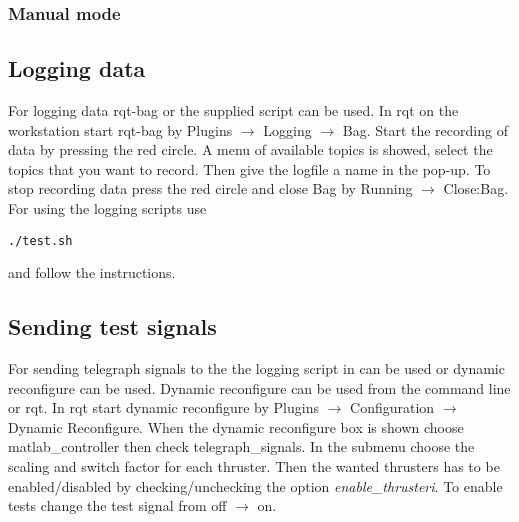 \subsubsection{Manual mode}

\subsection{Logging data}\label{sec:logging}
For logging data rqt-bag or the supplied script can be used. In rqt on the workstation start rqt-bag by Plugins $\rightarrow$ Logging $\rightarrow$ Bag. Start the recording of data by pressing the red circle. A menu of available topics is showed, select the topics that you want to record. Then give the logfile a name in the pop-up.
To stop recording data press the red circle and close Bag by Running $\rightarrow$ Close:Bag. For using the logging scripts use 
\begin{lstlisting}
./test.sh
\end{lstlisting}
and follow the instructions.

\subsection{Sending test signals}
For sending telegraph signals to the \abbrROV the logging script in  can be used or dynamic reconfigure can be used. Dynamic reconfigure can be used from the command line or rqt. In rqt start dynamic reconfigure by Plugins $\rightarrow$ Configuration $\rightarrow$ Dynamic Reconfigure. When the dynamic reconfigure box is shown choose matlab\_controller then check telegraph\_signals. In the submenu choose the scaling and switch factor for each thruster. Then the wanted thrusters has to be enabled/disabled by checking/unchecking the option \textit{enable_thrusteri}. To enable tests change the test signal from off $\rightarrow$ on.    

